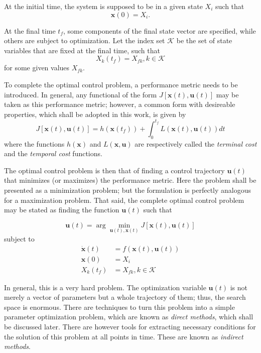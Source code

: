 At the initial time, the system is supposed to be in a given state \(X_i\) such that 
\begin{equation} \label{eq:generic_initial_constraint}
    \mathbf{x}(0) = X_i.
\end{equation}

At the final time \(t_f\), some components of the final state vector are specified, while others are subject to optimization. Let the index set \(\mathcal{K}\) be the set of state variables that are fixed at the final time, such that
\begin{equation} \label{eq:generic_final_constraint}
    X_k(t_f) = X_{fk}, k\in \mathcal{K}
\end{equation}
for some given values \(X_{fk}\).

To complete the optimal control problem, a performance metric needs to be introduced. In general, any functional of the form \(J[\mathbf{x}(t), \mathbf{u}(t)]\) may be taken as this performance metric; however, a common form with desireable properties, which shall be adopted in this work, is given by
\begin{equation} \label{eq:generic_cost}
    J[\mathbf{x}(t), \mathbf{u}(t)] = h(\mathbf{x}(t_f)) + \int_0^{t_f} L(\mathbf{x}(t), \mathbf{u}(t)) dt
\end{equation}
where the functions \(h(\mathbf{x})\) and \(L(\mathbf{x}, \mathbf{u})\) are respectively called the \textit{terminal cost} and the \textit{temporal cost} functions.\

The optimal control problem is then that of finding a control trajectory \(\mathbf{u}(t)\) that minimizes (or maximizes) the performance metric. Here the problem shall be presented as a minimization problem; but the formulation is perfectly analogous for a maximization problem. That said, the complete optimal control problem may be stated as finding the function \(\mathbf{u}(t)\) such that

\begin{equation} \label{eq:argmin_cost}
    \mathbf{u}(t) = \arg \min_{\mathbf{u}(t), \mathbf{x}(t)} J[\mathbf{x}(t), \mathbf{u}(t)]
\end{equation}
subject to
\begin{align}
    \dot{\mathbf{x}}(t) &= f(\mathbf{x}(t), \mathbf{u}(t)) \\
    \mathbf{x}(0) &= X_i \\
    X_k(t_f) &= X_{fk}, k\in \mathcal{K}
\end{align}

In general, this is a very hard problem. The optimization variable \(\mathbf{u}(t)\) is not merely a vector of parameters but a whole trajectory of them; thus, the search space is enormous. There are techniques to turn this problem into a simple parameter optimization problem, which are known as \textit{direct methods}, which shall be discussed later. There are however tools for extracting necessary conditions for the solution of this problem at all points in time. These are known as \textit{indirect methods}.

